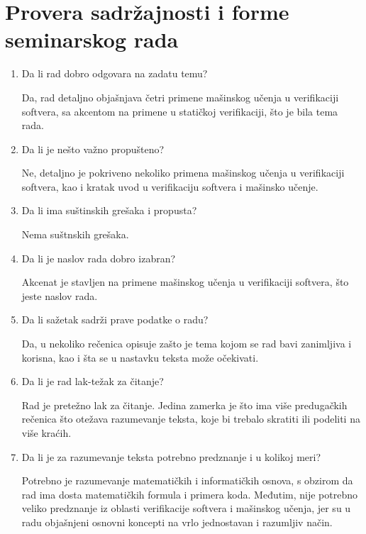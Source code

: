 \documentclass[a4paper]{report}
\begin{document}
\section{Provera sadržajnosti i forme seminarskog rada}

\begin{enumerate}
\item Da li rad dobro odgovara na zadatu temu?

Da, rad detaljno objašnjava četri primene mašinskog učenja u verifikaciji softvera, sa akcentom na primene u statičkoj verifikaciji, što je bila tema rada. 

\item Da li je nešto važno propušteno?

Ne, detaljno je pokriveno nekoliko primena mašinskog učenja u verifikaciji softvera, kao i kratak uvod u verifikaciju softvera i mašinsko učenje.

\item Da li ima suštinskih grešaka i propusta?

Nema suštnskih grešaka.

\item Da li je naslov rada dobro izabran?

Akcenat je stavljen na primene mašinskog učenja u verifikaciji softvera, što jeste naslov rada.

\item Da li sažetak sadrži prave podatke o radu?

Da, u nekoliko rečenica opisuje zašto je tema kojom se rad bavi zanimljiva i korisna, kao i šta se u nastavku teksta može očekivati.

\item Da li je rad lak-težak za čitanje?

Rad je pretežno lak za čitanje. Jedina zamerka je što ima više predugačkih rečenica što otežava razumevanje teksta, koje bi trebalo skratiti ili podeliti na više kraćih.

\item Da li je za razumevanje teksta potrebno predznanje i u kolikoj meri?

Potrebno je razumevanje matematičkih i informatičkih osnova, s obzirom da rad ima dosta matematičkih formula i primera koda. Međutim, nije potrebno veliko predznanje iz oblasti verifikacije softvera i mašinskog učenja, jer su u radu objašnjeni osnovni koncepti na vrlo jednostavan i razumljiv način.


\end{enumerate}
\end{document}
